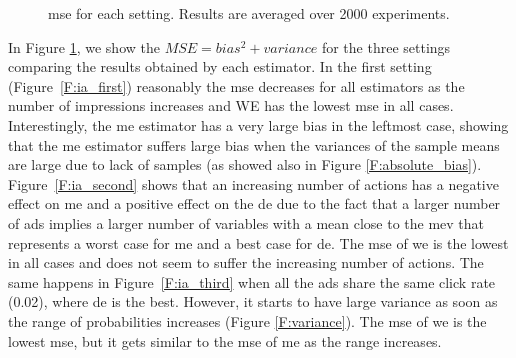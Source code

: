 \begin{figure}[t]
\begin{minipage}{\textwidth}
    \caption[Internet ads results]{\gls{mse} for each setting. Results are averaged over 2000 experiments.}\label{F:iAds}
    \end{minipage}
\end{figure}

In Figure \ref{F:iAds}, we show the $MSE = bias^2 + variance$ for the three settings comparing the results obtained by each estimator. 
In the first setting (Figure~\ref{F:ia_first}) reasonably the \gls{mse} decreases for all estimators as the number of impressions increases and WE has the lowest \gls{mse} in all cases. Interestingly, the \gls{me} estimator has a very large bias in the leftmost case, showing that the \gls{me} estimator suffers large bias when the variances of the sample means are large due to lack of samples (as showed also in Figure \ref{F:absolute_bias}).
Figure~\ref{F:ia_second} shows that an increasing number of actions has a negative effect on \gls{me} and a positive effect on the \gls{de} due to the fact that a larger number of ads implies a larger number of variables with a mean close to the \gls{mev} that represents a worst case for \gls{me} and a best case for \gls{de}. 
The \gls{mse} of \gls{we} is the lowest in all cases and does not seem to suffer the increasing number of actions. 
The same happens in Figure~\ref{F:ia_third} when all the ads share the same click rate (0.02), where \gls{de} is the best.
However, it starts to have large variance as soon as the range of probabilities increases (Figure \ref{F:variance}). 
The \gls{mse} of \gls{we} is the lowest \gls{mse}, but it gets similar to the \gls{mse} of \gls{me} as the range increases.

